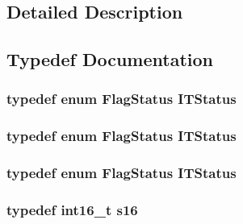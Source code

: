 \subsection{Detailed Description}


\subsection{Typedef Documentation}
\hypertarget{group___exported__types_gaacbd7ed539db0aacd973a0f6eca34074}{
\subsubsection[{I\-T\-Status}]{\setlength{\rightskip}{0pt plus 5cm}typedef  enum {\bf Flag\-Status}  {\bf I\-T\-Status}}}\label{group___exported__types_gaacbd7ed539db0aacd973a0f6eca34074}
\hypertarget{group___exported__types_gaacbd7ed539db0aacd973a0f6eca34074}{
\subsubsection[{I\-T\-Status}]{\setlength{\rightskip}{0pt plus 5cm}typedef  enum {\bf Flag\-Status}  {\bf I\-T\-Status}}}\label{group___exported__types_gaacbd7ed539db0aacd973a0f6eca34074}
\hypertarget{group___exported__types_gaacbd7ed539db0aacd973a0f6eca34074}{
\subsubsection[{I\-T\-Status}]{\setlength{\rightskip}{0pt plus 5cm}typedef  enum {\bf Flag\-Status}  {\bf I\-T\-Status}}}\label{group___exported__types_gaacbd7ed539db0aacd973a0f6eca34074}
\hypertarget{group___exported__types_gaa980e2c02ba2305e0f489d5650655425}{
\subsubsection[{s16}]{\setlength{\rightskip}{0pt plus 5cm}typedef {\bf int16\-\_\-t} {\bf s16}}}\label{group___exported__types_gaa980e2c02ba2305e0f489d5650655425}


